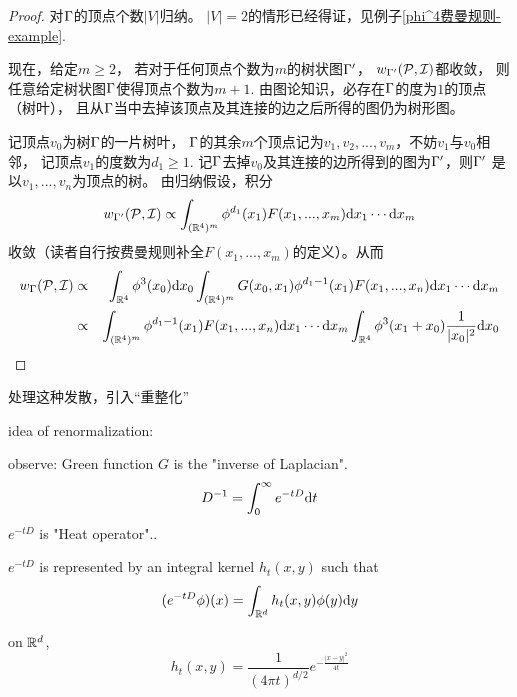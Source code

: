 \begin{proof}
对$\Gamma$的顶点个数$|V|$归纳。
$|V|=2$的情形已经得证，见例子\ref{phi^4费曼规则-example}.

现在，给定$m\geq 2$，
若对于任何顶点个数为$m$的树状图$\Gamma'$，
$w_{\Gamma'}(\mathcal{P},\mathcal{I})$都收敛，
则任意给定树状图$\Gamma$使得顶点个数为$m+1$.
由图论知识，必存在$\Gamma$的度为$1$的顶点（树叶），
且从$\Gamma$当中去掉该顶点及其连接的边之后所得的图仍为树形图。

记顶点$v_0$为树$\Gamma$的一片树叶，
$\Gamma$的其余$m$个顶点记为$v_1,v_2,...,v_m$，不妨$v_1$与$v_0$相邻，
记顶点$v_1$的度数为$d_1\geq 1$.
记$\Gamma$去掉$v_0$及其连接的边所得到的图为$\Gamma'$，则$\Gamma'$
是以$v_1,...,v_n$为顶点的树。
由归纳假设，积分
$$
  w_{\Gamma'}(\mathcal{P},\mathcal{I})
\propto
  \int_{(\mathbb{R}^4)^m}
    \phi^{d_1}(x_1)F(x_1,...,x_m)
    \mathrm{d} x_1\cdots\mathrm{d} x_m
$$
收敛（读者自行按费曼规则补全$F(x_1,...,x_m)$的定义）。从而
\begin{eqnarray*}
     w_\Gamma(\mathcal{P},\mathcal{I})
&\propto&
     \int_{\mathbb{R}^4}
       \phi^3(x_0)
       \mathrm{d} x_0
     \int_{(\mathbb{R}^4)^{m}}
       G(x_0,x_1)
       \phi^{d_1-1}(x_1)
       F(x_1,...,x_n)
       \mathrm{d} x_1\cdots\mathrm{d} x_m\\
&\propto&
     \int_{(\mathbb{R}^4)^{m}}
       \phi^{d_1-1}(x_1)
       F(x_1,...,x_n)
       \mathrm{d} x_1\cdots\mathrm{d} x_m
     \int_{\mathbb{R}^4}
       \phi^3(x_1+x_0)
       \frac{1}{|x_0|^2}
       \mathrm{d} x_0
\end{eqnarray*}

\end{proof}


处理这种发散，引入“重整化”

idea of renormalization:

observe: Green function $G$ is the "inverse of Laplacian".
$$D^{-1}=\int_0^\infty e^{-tD}\mathrm{d} t$$
$e^{-tD}$ is "Heat operator"..

$e^{-tD}$ is represented by an integral kernel
$h_t(x,y)$ such that
$$(e^{-tD}\phi)(x)=\int_{\mathbb{R}^d}h_t(x,y)\phi(y)\mathrm{d} y$$

on $\mathbb{R}^d$,
$$h_t(x,y)=\frac{1}{(4\pi t)^{d/2}}e^{-\frac{|x-y|^2}{4t}}$$

